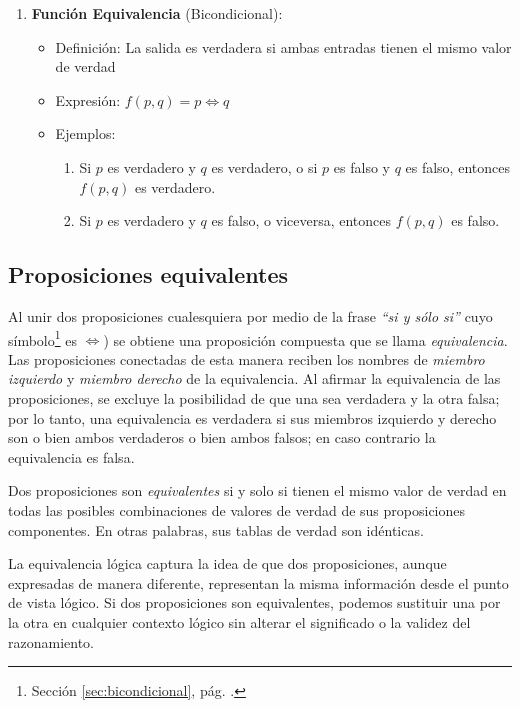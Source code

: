 \begin{enumerate}
	\item \textbf{Función Equivalencia} (Bicondicional):
	\begin{itemize}
		\item Definición: La salida es verdadera si ambas entradas tienen el mismo valor de verdad
		\item Expresión: \( f(p, q) = p \iff q  \)
		\item Ejemplos:
		\begin{enumerate}
			\item Si $p$ es verdadero y $q$ es verdadero, o si $p$ es falso y $q$ es falso, entonces $f(p, q)$ es verdadero.
			\item Si $p$ es verdadero y $q$ es falso, o viceversa, entonces $f(p, q)$ es falso.
		\end{enumerate}
	\end{itemize}
\end{enumerate}

\subsection{Proposiciones equivalentes}
Al unir dos proposiciones cualesquiera por medio de la frase \textit{``si y sólo si''} cuyo símbolo\footnote{Sección \ref{sec:bicondicional}, pág. \pageref{sec:bicondicional}.} es \( \iff \)) se obtiene una proposición compuesta que se llama \textit{equivalencia}. Las proposiciones conectadas de esta manera reciben los nombres de \textit{miembro izquierdo} y \textit{miembro derecho} de la equivalencia. Al afirmar la equivalencia de las proposiciones, se excluye la posibilidad de que una sea verdadera y la otra falsa; por lo tanto, una equivalencia es verdadera si sus miembros izquierdo y derecho son o bien ambos verdaderos o bien ambos falsos; en caso contrario la equivalencia es falsa.

Dos proposiciones son \textit{equivalentes} si y solo si tienen el mismo valor de verdad en todas las posibles combinaciones de valores de verdad de sus proposiciones componentes. En otras palabras, sus tablas de verdad son idénticas.

La equivalencia lógica captura la idea de que dos proposiciones, aunque expresadas de manera diferente, representan la misma información desde el punto de vista lógico. Si dos proposiciones son equivalentes, podemos sustituir una por la otra en cualquier contexto lógico sin alterar el significado o la validez del razonamiento.

